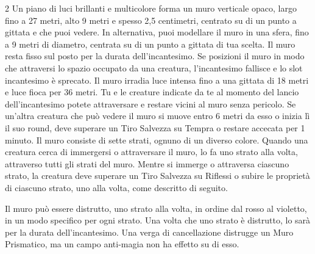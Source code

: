 \begin{multicols}{2}
Un piano di luci brillanti e multicolore forma un muro verticale opaco, largo fino a 27 metri, alto 9 metri e spesso 2,5 centimetri, centrato su di un punto a gittata e che puoi vedere. In alternativa, puoi modellare il muro in una sfera, fino a 9 metri di diametro, centrata su di un punto a gittata di tua scelta. Il muro resta fisso sul posto per la durata dell'incantesimo. Se posizioni il muro in modo che attraversi lo spazio occupato da una creatura, l'incantesimo fallisce e lo slot incantesimo è sprecato. Il muro irradia luce intensa fino a una gittata di 18 metri e luce fioca per 36 metri. Tu e le creature indicate da te al momento del lancio dell'incantesimo potete attraversare e restare vicini al muro senza pericolo. Se un'altra creatura che può vedere il muro si muove entro 6 metri da esso o inizia lì il suo round, deve superare un Tiro Salvezza su Tempra o restare accecata per 1 minuto. Il muro consiste di sette strati, ognuno di un diverso colore. Quando una creatura cerca di immergersi o attraversare il muro, lo fa uno strato alla volta, attraverso tutti gli strati del muro. Mentre si immerge o attraversa ciascuno strato, la creatura deve superare un Tiro Salvezza su Riflessi o subire le proprietà di ciascuno strato, uno alla volta, come descritto di seguito.

Il muro può essere distrutto, uno strato alla volta, in ordine dal rosso al violetto, in un modo specifico per ogni strato. Una volta che uno strato è distrutto, lo sarà per la durata dell'incantesimo. Una verga di cancellazione distrugge un Muro Prismatico, ma un campo anti-magia non ha effetto su di esso.


\end{multicols}
